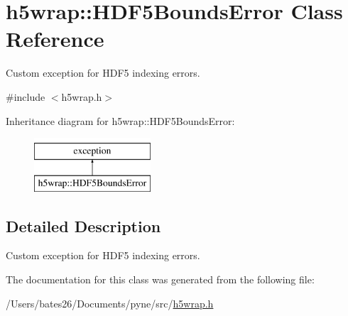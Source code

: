 \hypertarget{classh5wrap_1_1_h_d_f5_bounds_error}{\section{h5wrap\+:\+:H\+D\+F5\+Bounds\+Error Class Reference}
\label{classh5wrap_1_1_h_d_f5_bounds_error}
}


Custom exception for H\+D\+F5 indexing errors.  




{\ttfamily \#include $<$h5wrap.\+h$>$}

Inheritance diagram for h5wrap\+:\+:H\+D\+F5\+Bounds\+Error\+:\begin{figure}[H]
\begin{center}
\leavevmode
\includegraphics[height=2.000000cm]{classh5wrap_1_1_h_d_f5_bounds_error}
\end{center}
\end{figure}


\subsection{Detailed Description}
Custom exception for H\+D\+F5 indexing errors. 

The documentation for this class was generated from the following file\+:\begin{DoxyCompactItemize}
\item 
/\+Users/bates26/\+Documents/pyne/src/\hyperlink{h5wrap_8h}{h5wrap.\+h}\end{DoxyCompactItemize}
